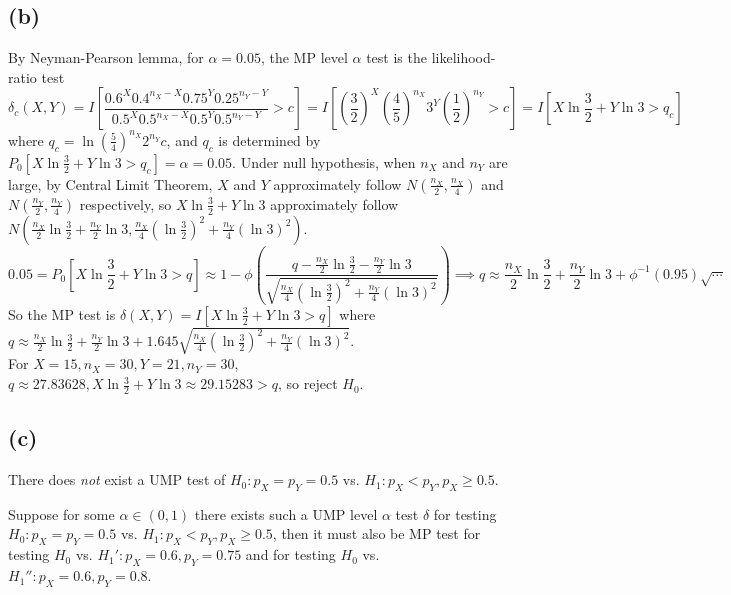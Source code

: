 \subsection*{(b)}
By Neyman-Pearson lemma, for $\alpha=0.05$, the MP level $\alpha$ test is the likelihood-ratio test
$$
\delta_c(X, Y) =
I\left[
\frac{0.6^{X}0.4^{n_X-X}0.75^{Y}0.25^{n_Y-Y}}
{0.5^{X}0.5^{n_X-X}0.5^{Y}0.5^{n_Y-Y}}
> c \right]
=
I\left[
(\frac{3}{2})^{X}(\frac{4}{5})^{n_X}3^{Y}(\frac{1}{2})^{n_Y}
> c \right]
=
I\left[
X\ln\frac{3}{2} + Y\ln3 > q_c
\right]
$$
where $q_c = \ln (\frac{5}{4})^{n_X} 2^{n_Y} c$, and $q_c$ is determined by
$
P_0 \left[
X\ln\frac{3}{2} + Y\ln3
> q_c
\right] = \alpha = 0.05
$.
Under null hypothesis, when $n_X$ and $n_Y$ are large, by Central Limit Theorem, $X$ and $Y$ approximately follow $N(\frac{n_X}{2}, \frac{n_X}{4})$ and $N(\frac{n_Y}{2}, \frac{n_Y}{4})$ respectively, so
$
X\ln\frac{3}{2} + Y\ln3
$
approximately follow
$
N(\frac{n_X}{2} \ln \frac{3}{2}+\frac{n_Y}{2}\ln3,
\frac{n_X}{4}(\ln\frac{3}{2})^2 + \frac{n_Y}{4}(\ln 3)^2)
$.
$$
0.05 = P_0 \left[
X\ln\frac{3}{2} + Y\ln3
> q
\right] \approx
1-
\phi\left(\frac{q-\frac{n_X}{2} \ln \frac{3}{2}-\frac{n_Y}{2}\ln3}
{\sqrt{\frac{n_X}{4}(\ln\frac{3}{2})^2 + \frac{n_Y}{4}(\ln 3)^2}}
\right)
\implies
q \approx 
\frac{n_X}{2} \ln \frac{3}{2}+\frac{n_Y}{2}\ln3+
\phi^{-1}(0.95)
\sqrt{\cdots}
$$
So the MP test is
$
\delta(X, Y) =
I\left[
X\ln\frac{3}{2} + Y\ln3 > q
\right]
$
where
$
q \approx 
\frac{n_X}{2} \ln \frac{3}{2}+\frac{n_Y}{2}\ln3+
1.645
{\sqrt{\frac{n_X}{4}(\ln\frac{3}{2})^2 + \frac{n_Y}{4}(\ln 3)^2}}
$. \\
For $X=15, n_X=30, Y=21, n_Y=30$,
$q \approx 27.83628, X\ln\frac{3}{2}+Y\ln3 \approx 29.15283 > q$, so reject $H_0$.

\subsection*{(c)}
There does \emph{not} exist a UMP test of
$H_0: p_X=p_Y=0.5$
vs.
$H_1: p_X<p_Y, p_X \geq 0.5$.

Suppose for some $\alpha \in (0, 1)$ there exists such a UMP level $\alpha$ test
$\delta$ for testing $H_0: p_X=p_Y=0.5$ vs. $H_1: p_X<p_Y, p_X \geq 0.5$, then it must also be MP test for testing
$
H_0 
$
vs.
$
H_1': p_X=0.6, p_Y=0.75
$
and for testing
$H_0$ vs.
$
H_1'': p_X=0.6, p_Y=0.8
$.

